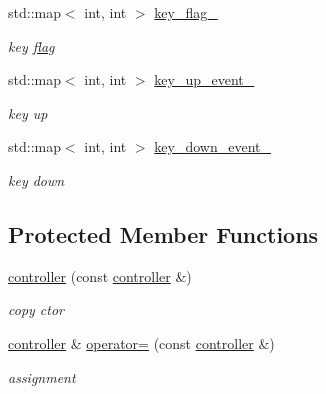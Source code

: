 \begin{DoxyCompactItemize}
std::map$<$ int, int $>$ \hyperlink{classnebula_1_1content_1_1actor_1_1admin_1_1controller_a797fbec85cc80474e36907e48787de8f}{key\_\-flag\_\-}
\begin{DoxyCompactList}\small\item\em key \hyperlink{structnebula_1_1content_1_1actor_1_1admin_1_1controller_1_1flag}{flag} \item\end{DoxyCompactList}\item 
std::map$<$ int, int $>$ \hyperlink{classnebula_1_1content_1_1actor_1_1admin_1_1controller_ae73445e6b5a6219360b94348939ae531}{key\_\-up\_\-event\_\-}
\begin{DoxyCompactList}\small\item\em key up \item\end{DoxyCompactList}\item 
std::map$<$ int, int $>$ \hyperlink{classnebula_1_1content_1_1actor_1_1admin_1_1controller_a04e8a5bdd18017802846a2bc18f398b7}{key\_\-down\_\-event\_\-}
\begin{DoxyCompactList}\small\item\em key down \item\end{DoxyCompactList}\end{DoxyCompactItemize}
\subsection*{Protected Member Functions}
\begin{DoxyCompactItemize}
\item 
\hyperlink{classnebula_1_1content_1_1actor_1_1admin_1_1controller_a5609547224ef63eb22044e6e57301b7d}{controller} (const \hyperlink{classnebula_1_1content_1_1actor_1_1admin_1_1controller}{controller} \&)
\begin{DoxyCompactList}\small\item\em copy ctor \item\end{DoxyCompactList}\item 
\hyperlink{classnebula_1_1content_1_1actor_1_1admin_1_1controller}{controller} \& \hyperlink{classnebula_1_1content_1_1actor_1_1admin_1_1controller_a4353c8b538a9a5334152f3b3eab5034d}{operator=} (const \hyperlink{classnebula_1_1content_1_1actor_1_1admin_1_1controller}{controller} \&)
\begin{DoxyCompactList}\small\item\em assignment \item\end{DoxyCompactList}\end{DoxyCompactItemize}


